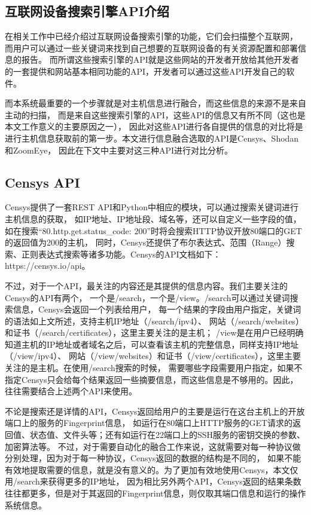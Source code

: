 \subsection{互联网设备搜索引擎API介绍}
\label{sec:API-intro}

在相关工作中已经介绍过互联网设备搜索引擎的功能，它们会扫描整个互联网，
而用户可以通过一些关键词来找到自己想要的互联网设备的有关资源配置和部署信息的报告。
而所谓这些搜索引擎的API就是这些网站的开发者开放给其他开发者的一套提供和网站基本相同功能的API，开发者可以通过这些API开发自己的软件。

而本系统最重要的一个步骤就是对主机信息进行融合，而这些信息的来源不是来自主动的扫描，
而是来自这些搜索引擎的API，这些API的信息又有所不同（这也是本文工作意义的主要原因之一），
因此对这些API进行各自提供的信息的对比将是进行主机信息获取前的第一步。本文进行信息融合选取的API是Censys、Shodan和ZoomEye，
因此在下文中主要对这三种API进行对比分析。

\subsection{Censys API}
\label{sec:Censys-API}

Censys提供了一套REST API和Python中相应的模块，可以通过搜索关键词进行主机信息的获取，
如IP地址、IP地址段、域名等，还可以自定义一些字段的值，
如在搜索“80.http.get.status\_code: 200”时将会搜索HTTP协议开放80端口的GET的返回值为200的主机，
同时，Censys还提供了布尔表达式、范围（Range）搜索、正则表达式搜索等诸多功能。Censys的API文档如下：https://censys.io/api。

不过，对于一个API，最关注的内容还是其提供的信息内容。我们主要关注的Censys的API有两个，
一个是/search，一个是/view。/search可以通过关键词搜索信息，Censys会返回一个列表给用户，
每一个结果的字段由用户指定，关键词的语法如上文所述，支持主机IP地址（/search/ipv4）、
网站（/search/websites）和证书（/search/certificates），这里主要关注的是主机；
/view是在用户已经明确知道主机的IP地址或者域名之后，可以查看该主机的完整信息，同样支持IP地址（/view/ipv4）、
网站（/view/websites）和证书（/view/certificates），这里主要关注的是主机。在使用/search搜索的时候，
需要哪些字段需要用户指定，如果不指定Censys只会给每个结果返回一些摘要信息，而这些信息是不够用的。因此，往往需要结合上述两个API来使用。

不论是搜索还是详情的API，Censys返回给用户的主要是运行在这台主机上的开放端口上的服务的Fingerprint信息，
如运行在80端口上HTTP服务的GET请求的返回值、状态值、文件头等；还有如运行在22端口上的SSH服务的密钥交换的参数、加密算法等。
不过，对于需要自动化的融合工作来说，这就需要对每一种协议做分别处理，因为对于每一种协议，Censys返回的数据的结构是不同的，
如果不能有效地提取需要的信息，就是没有意义的。为了更加有效地使用Censys，本文仅用/search来获得更多的IP地址，
因为相比另外两个API，Censys返回的结果条数往往都更多，但是对于其返回的Fingerprint信息，则仅取其端口信息和运行的操作系统信息。

